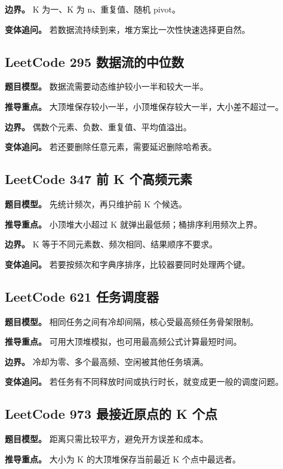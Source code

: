 \textbf{边界。} K 为一、K 为 n、重复值、随机 pivot。

\textbf{变体追问。} 若数据流持续到来，堆方案比一次性快速选择更自然。

\subsection{LeetCode 295 数据流的中位数}

\textbf{题目模型。} 数据流需要动态维护较小一半和较大一半。

\textbf{推导重点。} 大顶堆保存较小一半，小顶堆保存较大一半，大小差不超过一。

\textbf{边界。} 偶数个元素、负数、重复值、平均值溢出。

\textbf{变体追问。} 若还要删除任意元素，需要延迟删除哈希表。

\subsection{LeetCode 347 前 K 个高频元素}

\textbf{题目模型。} 先统计频次，再只维护前 K 个候选。

\textbf{推导重点。} 小顶堆大小超过 K 就弹出最低频；桶排序利用频次上界。

\textbf{边界。} K 等于不同元素数、频次相同、结果顺序不要求。

\textbf{变体追问。} 若要按频次和字典序排序，比较器要同时处理两个键。

\subsection{LeetCode 621 任务调度器}

\textbf{题目模型。} 相同任务之间有冷却间隔，核心受最高频任务骨架限制。

\textbf{推导重点。} 可用大顶堆模拟，也可用最高频公式计算最短时间。

\textbf{边界。} 冷却为零、多个最高频、空闲被其他任务填满。

\textbf{变体追问。} 若任务有不同释放时间或执行时长，就变成更一般的调度问题。

\subsection{LeetCode 973 最接近原点的 K 个点}

\textbf{题目模型。} 距离只需比较平方，避免开方误差和成本。

\textbf{推导重点。} 大小为 K 的大顶堆保存当前最近 K 个点中最远者。

